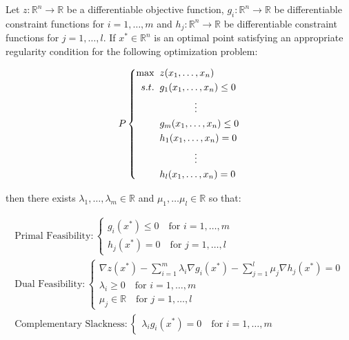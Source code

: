 \begin{theorem} Let $z : \mathbb{R}^n \rightarrow \mathbb{R}$ be a differentiable objective function, $g_i:\mathbb{R}^n \rightarrow \mathbb{R}$ be differentiable constraint functions for $i = 1,\dots,m$ and $h_j:\mathbb{R}^n \rightarrow \mathbb{R}$ be differentiable constraint functions for $j=1,\dots,l$. If ${x}^* \in \mathbb{R}^n$ is an optimal point satisfying an appropriate regularity condition for the following optimization problem:

\begin{equation}
P\left\{
\begin{aligned}
\max\;\;& z(x_1,\dots,x_n)\\
s.t.\;\;& g_1(x_1,\dots,x_n) \leq 0\\
& \hspace*{0.5in}\vdots\\
& g_m(x_1,\dots,x_n) \leq 0\\
& h_1(x_1,\dots,x_n) = 0\\
&\hspace*{0.5in}\vdots\\
&h_l(x_1,\dots,x_n) = 0
\end{aligned}
\right.
\end{equation}

then there exists $\lambda_1,\dots,\lambda_m \in \mathbb{R}$ and $\mu_1,\dots\mu_l \in \mathbb{R}$ so that:

\begin{gather*}
\text{Primal Feasibility}: \left\{
\begin{aligned}
g_i({x}^*) \leq 0 \quad \text{for $i = 1,\dots,m$}\\
h_j({x}^*) = 0 \quad \text{for $j = 1,\dots,l$}
\end{aligned}
\right.\\
\text{Dual Feasibility}:\left\{
\begin{aligned}
\nabla z({x}^*) - \sum_{i = 1}^m\lambda_i\nabla g_i({x}^*) - \sum_{j = 1}^{l}\mu_j\nabla h_j({x}^*) = {0}\\
\lambda_i \geq 0 \quad \text{for $i=1,\dots,m$}\\
\mu_j \in \mathbb{R} \quad \text{for $j = 1,\dots,l$}
\end{aligned}
\right.\\
\text{Complementary Slackness}:\left\{
\begin{aligned}
\lambda_ig_i({x}^*) = 0 \quad \text{for $i = 1,\dots,m$}
\end{aligned}
\right.
\end{gather*}
\label{thm:KKT7}
\end{theorem}

